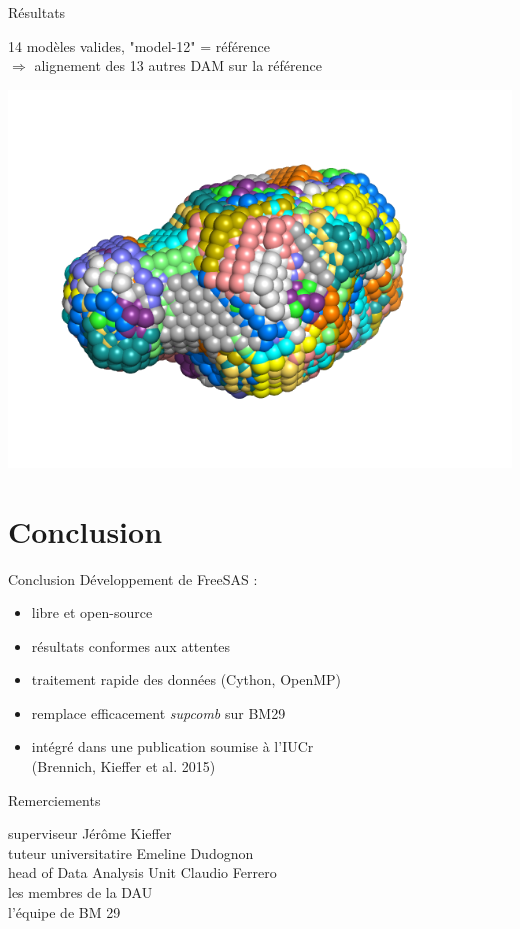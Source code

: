 \documentclass{beamer}
\begin{document}
\begin{frame}{R\'esultats}

14 mod\`eles valides, "model-12" = r\'ef\'erence\\
$\Rightarrow$ alignement des 13 autres DAM sur la r\'ef\'erence

\begin{minipage}{\linewidth}
    \includegraphics[scale=0.45]{alignedmodels.png}
\end{minipage}
\end{frame}

\section*{Conclusion}

\begin{frame}{Conclusion}
D\'eveloppement de FreeSAS : 
\begin{itemize}
\item libre et open-source
\item r\'esultats conformes aux attentes
\item traitement rapide des donn\'ees (Cython, OpenMP)
\item remplace efficacement \textit{supcomb} sur BM29
\item int\'egr\'e dans une publication soumise \`a l'IUCr\\
  (Brennich, Kieffer et al. 2015)
\end{itemize}
\end{frame}

\begin{frame}{Remerciements}
\begin{center}
superviseur J\'er\^ome Kieffer\\
tuteur universitatire Emeline Dudognon\\
head of Data Analysis Unit Claudio Ferrero\\
les membres de la DAU\\
l'\'equipe de BM 29
\end{center}
\end{frame}
\end{document}

